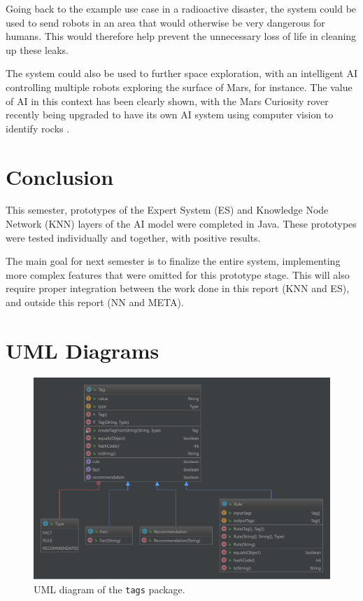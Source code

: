 \documentclass[titlepage,11pt]{article}
\newcommand{\code}[1]{\texttt{#1}}
\begin{document}
Going back to the example use case in a radioactive disaster, the system could be used to send robots in an area that would otherwise be very dangerous for humans. This would therefore help prevent the unnecessary loss of life in cleaning up these leaks.


The system could also be used to further space exploration, with an intelligent AI controlling multiple robots exploring the surface of Mars, for instance. The value of AI in this context has been clearly shown, with the Mars Curiosity rover recently being upgraded to have its own AI system using computer vision to identify rocks \cite{rover}.

\section{Conclusion}

This semester, prototypes of the Expert System (ES) and Knowledge Node Network (KNN) layers of the AI model were completed in Java. These prototypes were tested individually and together, with positive results.

The main goal for next semester is to finalize the entire system, implementing more complex features that were omitted for this prototype stage. This will also require proper integration between the work done in this report (KNN and ES), and outside this report (NN and META).

\clearpage
\onecolumn
\appendix

\section{UML Diagrams}
\label{sec:uml}

\begin{figure}[!htb]
	\centering
	\includegraphics[width=\columnwidth]{figures/uml_tags.pdf}
	\caption{UML diagram of the \code{tags} package.}
	\label{uml_tags}
\end{figure}
\end{document}

